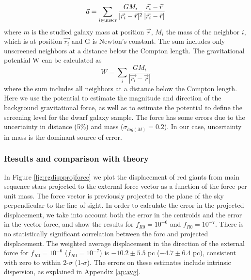 \documentclass{emulateapj}
\newcommand{\jakesays}[1]{{\color{red}[Jake says: #1]}}
\begin{document}
\begin{equation}
\vec{a} =\sum_{i \in {\rm unscr}}{\frac{G M_i}{|\vec{r_i}
-\vec{r}|^2} \frac{\vec{r_i}
-\vec{r}}{|\vec{r_i} -\vec{r}|} }
\label{eq:accelaration}
\end{equation}
where $m$ is the studied galaxy mass at position $\vec{r}$,
 $M_i$ the mass of the
neighbor $i$, which is at position $\vec{r_i}$ and G is Newton's
constant. The sum includes only unscreened neighbors at a distance below the
Compton length. 
The gravitational potential W can be calculated as 
\begin{equation}
 W=\sum_i{\frac{G M_i}{|\vec{r_i} -\vec{r}|}  }
\end{equation}
where the sum includes all neighbors at a distance below the Compton length.
Here we use the potential to estimate the magnitude and direction of the
background gravitational force, as well as to estimate the potential to
define the screening level for the dwarf galaxy sample.
The force has some errors due to the
uncertainty in distance (5\%) and mass ($\sigma_{log(M)}=0.2$).
In our case, uncertainty in mass is the
dominant source of error. 

\subsubsection{Results and comparison with theory}
In Figure \ref{fig:rgdispprojforce} we plot the displacement of red
giants from  main sequence stars projected to the external force vector as a 
function of the force per unit mass. The force vector is previously
projected to the plane of the sky perpendicular to the line of sight.
In order to calculate the error in the projected displacement, 
we take into account both the error in the centroids and the error in the
vector force, and show the results for $f_{R0}=10^{-6}$ and $f_{R0}=10^{-7}$.
There is no statistically significant correlation between the forc and
projected displacement.
The weighted average displacement in the direction of the 
external force for $f_{R0} = 10^{-6}$ ($f_{R0} = 10^{-7}$) is
$-10.2\pm5.5$ pc ($-4.7\pm6.4$ pc),
consistent with zero to within 2-$\sigma$ (1-$\sigma$).
The errors on these estimates include intrinsic dispersion, as explained
in Appendix \ref{ap:avg}.
\end{document}
